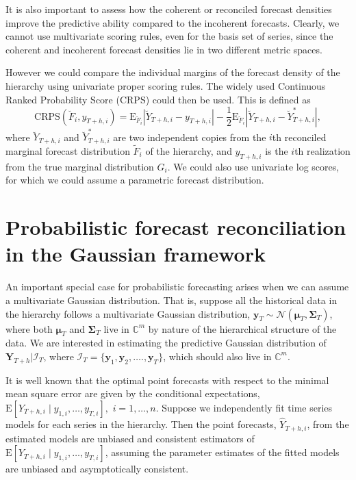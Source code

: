 \documentclass[a4paper, 11pt]{article}
\def\E{\text{E}}
\theoremstyle{theo}
\theoremstyle{definition}
\begin{document}
It is also important to assess how the coherent or reconciled forecast densities improve the predictive ability compared to the incoherent forecasts. Clearly, we cannot use multivariate scoring rules, even for the basis set of series, since the coherent and incoherent forecast densities lie in two different metric spaces.

However we could compare the individual margins of the forecast density of the hierarchy using univariate proper scoring rules. The widely used Continuous Ranked Probability Score (CRPS) could then be used. This is defined as
\begin{equation} \label{eq:(3.6)}
\text{CRPS}(\breve{F}_i,y_{T+h,i}) = \E_{\breve{F}_i}|\breve{Y}_{T+h,i}-y_{T+h,i}| - \frac{1}{2}\E_{\breve{F}_i}|\breve{Y}_{T+h,i}-\breve{Y}^*_{T+h,i}|,
\end{equation}
where $\breve{Y}_{T+h,i}$ and $\breve{Y}^*_{T+h,i}$ are two independent copies from the $i$th reconciled marginal forecast distribution $\tilde{F}_i$ of the hierarchy, and $y_{T+h,i}$ is the $i$th realization from the true marginal distribution $G_i$. We could also use univariate log scores, for which we could assume a parametric forecast distribution.

\section{Probabilistic forecast reconciliation in the Gaussian framework}\label{sec:gaussian}

An important special case for probabilistic forecasting arises when we can assume a multivariate Gaussian distribution. That is, suppose all the historical data in the hierarchy follows a multivariate Gaussian distribution, $\bm{y}_T \sim \mathcal{N}(\bm{\mu}_T, \bm{\Sigma}_T)$, where both $\bm{\mu}_T$ and $\bm{\Sigma}_T$ live in $\mathbb{C}^m$ by nature of the hierarchical structure of the data. We are interested in estimating the predictive Gaussian distribution of $\bm{Y}_{T+h}| \bm{\mathcal{I}}_T$, where $\bm{\mathcal{I}}_T= \{\bm{y}_1,\bm{y}_2,\dots.,\bm{y}_T\}$, which should also live in $\mathbb{C}^m$.

It is well known that the optimal point forecasts with respect to the minimal mean square error are given by the conditional expectations, $\E[Y_{T+h,i}\mid y_{1,i},\dots,y_{T,i}],$ $i=1,\dots,n$. Suppose we independently fit time series models for each series in the hierarchy. Then the point forecasts, $\hat{Y}_{T+h,i}$, from the estimated models are unbiased and consistent estimators of $\E[Y_{T+h,i}\mid y_{1,i},\dots,y_{T,i}]$, assuming the parameter estimates of the fitted models are unbiased and asymptotically consistent. 
\end{document}
